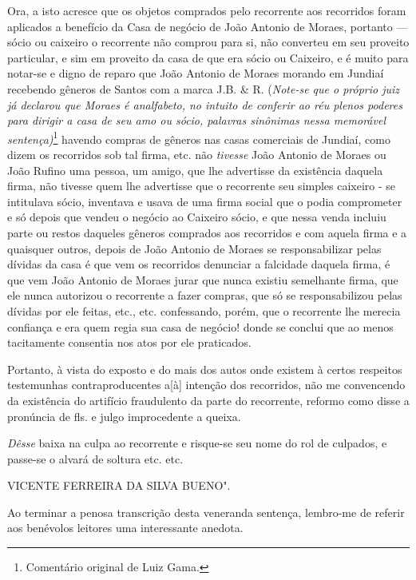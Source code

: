Ora, a isto acresce que os objetos comprados pelo recorrente aos
recorridos foram aplicados a benefício da Casa de negócio de João
Antonio de Moraes, portanto --- sócio ou caixeiro o recorrente não
comprou para si, não converteu em seu proveito particular, e sim em
proveito da casa de que era sócio ou Caixeiro, e é muito para notar-se e
digno de reparo que João Antonio de Moraes morando em Jundiaí recebendo
gêneros de Santos com a marca J.B. \& R. (\emph{Note-se que o próprio
juiz já declarou que Moraes é analfabeto, no intuito de conferir ao réu
plenos poderes para dirigir a casa de seu amo ou sócio, palavras
sinônimas nessa memorável sentença)}\footnote{Comentário original de
  Luiz Gama.} havendo compras de gêneros nas casas comerciais de
Jundiaí, como dizem os recorridos sob tal firma, etc. não \emph{tivesse}
João Antonio de Moraes ou João Rufino uma pessoa, um amigo, que lhe
advertisse da existência daquela firma, não tivesse quem lhe advertisse
que o recorrente seu simples caixeiro - se intitulava sócio, inventava e
usava de uma firma social que o podia comprometer e só depois que vendeu
o negócio ao Caixeiro sócio, e que nessa venda incluiu parte ou restos
daqueles gêneros comprados aos recorridos e com aquela firma e a
quaisquer outros, depois de João Antonio de Moraes se responsabilizar
pelas dívidas da casa é que vem os recorridos denunciar a falcidade
daquela firma, é que vem João Antonio de Moraes jurar que nunca existiu
semelhante firma, que ele nunca autorizou o recorrente a fazer compras,
que só se responsabilizou pelas dívidas por ele feitas, etc., etc.
confessando, porém, que o recorrente lhe merecia confiança e era quem
regia sua casa de negócio! donde se conclui que ao menos tacitamente
consentia nos atos por ele praticados.

Portanto, à vista do exposto e do mais dos autos onde existem à certos
respeitos testemunhas contraproducentes a{[}à{]} intenção dos
recorridos, não me convencendo da existência do artifício fraudulento da
parte do recorrente, reformo como disse a pronúncia de fls. e julgo
improcedente a queixa.

\emph{Dêsse} baixa na culpa ao recorrente e risque-se seu nome do rol de
culpados, e passe-se o alvará de soltura etc. etc.

VICENTE FERREIRA DA SILVA BUENO".

\asterisc

Ao terminar a penosa transcrição desta veneranda sentença, lembro-me de
referir aos benévolos leitores uma interessante anedota.

